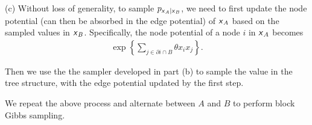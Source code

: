 \documentclass{article}
\newcommand{\s}[1]{\textsf{\textit{#1}}}
\begin{document}
\noindent
(c) Without loss of generality, to sample $p_{\s{x}_A | \s{x}_B}$, we need to first
update the node potential (can then be absorbed in the edge potential) of
$\s{x}_A$ based on the sampled values in $\s{x}_B$. Specifically, the node potential
of a node $i$ in $\s{x}_A$ becomes
\begin{align*}
	\exp\left\{{\sum_{j \in \partial i \cap B} \theta}x_ix_j\right\}.
\end{align*}

Then we use the the sampler developed in part (b) to sample the value in the
tree structure, with the edge potential updated by the first step.

We repeat the above process and alternate between $A$ and $B$ to perform
block Gibbs sampling.
\pagebreak

\end{document}
